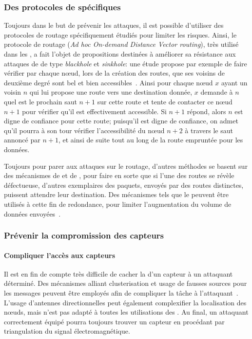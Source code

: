     \subsubsection{Des protocoles de  spécifiques}
Toujours dans le but de prévenir les attaques, il est possible d'utiliser des protocoles de routage spécifiquement étudiés pour limiter les risques.
Ainsi, le protocole de routage \aodv (\textit{Ad hoc On-demand Distance Vector routing}), très utilisé dans les \rcs, a fait l'objet de propositions destinées à améliorer sa résistance aux attaques de \dds de type \textit{blackhole} et \textit{sinkhole}: une étude propose par exemple de faire vérifier par chaque nœud, lors de la création des routes, que ses voisins de deuxième degré sont bel et bien accessibles~\cite{DLA02}.
Ainsi pour chaque nœud $x$ ayant un voisin $n$ qui lui propose une route vers une destination donnée, $x$ demande à $n$ quel est le prochain saut $n+1$ sur cette route et tente de contacter ce nœud $n+1$ pour vérifier qu'il est effectivement accessible.
Si $n+1$ répond, alors $n$ est digne de confiance pour cette route; puisqu'il est digne de confiance, on admet qu'il pourra à son tour vérifier l'accessibilité du nœud $n+2$ à travers le saut annoncé par $n+1$, et ainsi de suite tout au long de la route empruntée pour les données.

Toujours pour parer aux attaques sur le routage, d'autres méthodes se basent sur des mécanismes de  et de \resilience, pour faire en sorte que si l'une des routes se révèle défectueuse, d'autres exemplaires des paquets, envoyés par des routes distinctes, puissent attendre leur destination.
Des mécanismes tels que le  peuvent être utilisés à cette fin de redondance, pour limiter l'augmentation du volume de données envoyées~\cite{MMB13}.

    \subsubsection{Prévenir la compromission des capteurs}
        \paragraph{Compliquer l'accès aux capteurs}
Il est en fin de compte très difficile de cacher la  d'un capteur à un attaquant déterminé.
Des mécanismes alliant clusterisation et usage de fausses sources pour les messages peuvent être employés afin de compliquer la tâche à l'attaquant~\cite{GK13}.
L'usage d'antennes directionnelles peut également complexifier la localisation des nœuds, mais n'est pas adapté à toutes les utilisations des \rcs.
Au final, un attaquant correctement équipé pourra toujours trouver un capteur en procédant par triangulation du signal électromagnétique.

